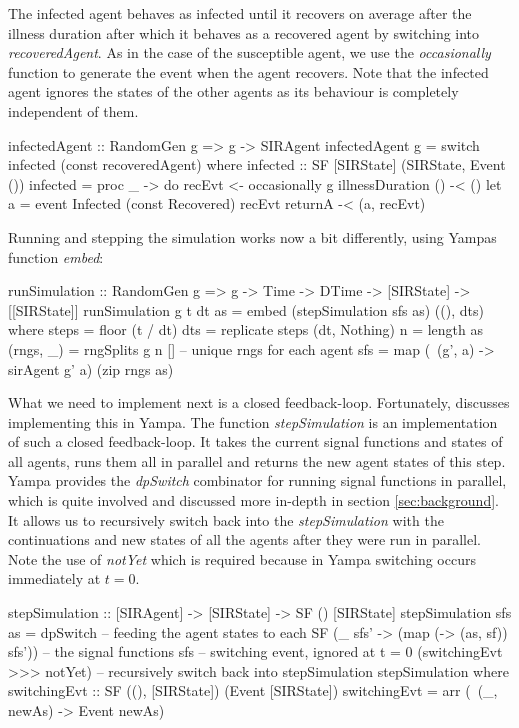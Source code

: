 The infected agent behaves as infected until it recovers on average after the illness duration after which it behaves as a recovered agent by switching into \textit{recoveredAgent}. As in the case of the susceptible agent, we use the \textit{occasionally} function to generate the event when the agent recovers. Note that the infected agent ignores the states of the other agents as its behaviour is completely independent of them.

\begin{HaskellCode}
infectedAgent :: RandomGen g => g -> SIRAgent
infectedAgent g = switch infected (const recoveredAgent)
  where
    infected :: SF [SIRState] (SIRState, Event ())
    infected = proc _ -> do
      recEvt <- occasionally g illnessDuration () -< ()
      let a = event Infected (const Recovered) recEvt
      returnA -< (a, recEvt)
\end{HaskellCode}

Running and stepping the simulation works now a bit differently, using Yampas function \textit{embed}:

\begin{HaskellCode}
runSimulation :: RandomGen g 
  => g -> Time -> DTime -> [SIRState] -> [[SIRState]]
runSimulation g t dt as 
    = embed (stepSimulation sfs as) ((), dts)
  where
    steps     = floor (t / dt)
    dts       = replicate steps (dt, Nothing)
    n         = length as
    (rngs, _) = rngSplits g n [] -- unique rngs for each agent
    sfs       = map (\ (g', a) -> sirAgent g' a) (zip rngs as)
\end{HaskellCode}

What we need to implement next is a closed feedback-loop. Fortunately, \cite{nilsson_functional_2002, courtney_yampa_2003} discusses implementing this in Yampa. The function \textit{stepSimulation} is an implementation of such a closed feedback-loop. It takes the current signal functions and states of all agents, runs them all in parallel and returns the new agent states of this step. Yampa provides the \textit{dpSwitch} combinator for running signal functions in parallel, which is quite involved and discussed more in-depth in section \ref{sec:background}. It allows us to recursively switch back into the \textit{stepSimulation} with the continuations and new states of all the agents after they were run in parallel. Note the use of \textit{notYet} which is required because in Yampa switching occurs immediately at $t = 0$.

\begin{HaskellCode}
stepSimulation :: [SIRAgent] -> [SIRState] -> SF () [SIRState]
stepSimulation sfs as =
    dpSwitch
      -- feeding the agent states to each SF
      (\_ sfs' -> (map (\sf -> (as, sf)) sfs'))
      -- the signal functions
      sfs
      -- switching event, ignored at t = 0         
      (switchingEvt >>> notYet)
      -- recursively switch back into stepSimulation         
      stepSimulation                            
  where
    switchingEvt :: SF ((), [SIRState]) (Event [SIRState])
    switchingEvt = arr (\ (_, newAs) -> Event newAs)
\end{HaskellCode}

